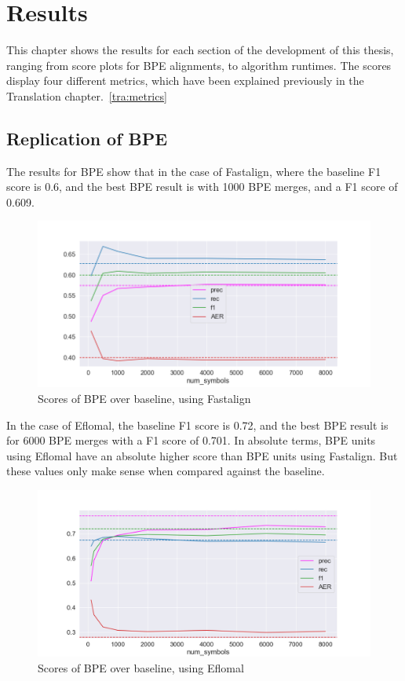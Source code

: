 %
%

\chapter{Results}\label{ch:results}

This chapter shows the results for each section of the development of this thesis, ranging from score plots for BPE alignments, to algorithm runtimes. The scores display four different metrics, which have been explained previously in the Translation chapter.~\ref{tra:metrics}

\section{Replication of BPE}

The results for BPE show that in the case of Fastalign, where the baseline F1 score is 0.6, and the best BPE result is with 1000 BPE merges, and a F1 score of 0.609.

\begin{figure}[!ht]
    \centering
    \includegraphics[width=12cm]{../reports/scores_normal_bpe/eng_deu_fastalign.png}
    \caption{Scores of BPE over baseline, using Fastalign}
\end{figure}

In the case of Eflomal, the baseline F1 score is 0.72, and the best BPE result is for 6000 BPE merges with a F1 score of 0.701. In absolute terms, BPE units using Eflomal have an absolute higher score than BPE units using Fastalign. But these values only make sense when compared against the baseline.

\begin{figure}[!ht]
    \centering
    \includegraphics[width=12cm]{../reports/scores_normal_bpe/eng_deu_eflomal.png}
    \caption{Scores of BPE over baseline, using Eflomal}
\end{figure}

